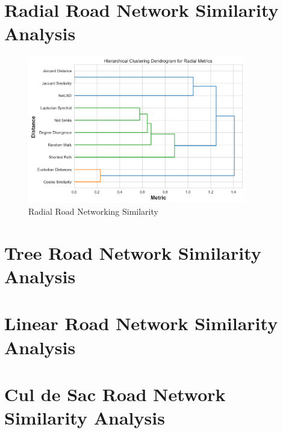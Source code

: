 \section{Radial Road Network Similarity Analysis}
\begin{figure}[!ht]
\centering
\includegraphics[width=0.85\textwidth,center]{picture/Radial/radial_metrics_dendrogram.png}
\caption[Miniaturtrichter]{Radial Road Networking Similarity}
\label{fig:network ranking}
\end{figure}

\section{Tree Road Network Similarity Analysis}
\section{Linear Road Network Similarity Analysis}
\section{Cul de Sac Road Network Similarity Analysis}
